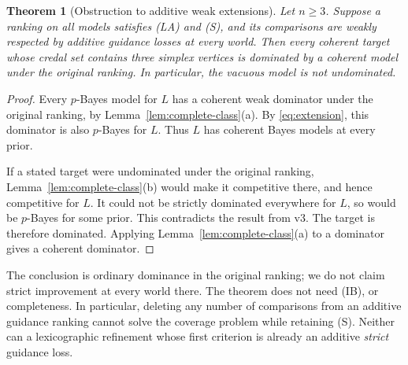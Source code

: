 \documentclass[11pt]{article}
\newtheorem{theorem}{Theorem}
\theoremstyle{remark}\newtheorem{remark}[theorem]{Remark}
\begin{document}
\begin{theorem}[Obstruction to additive weak extensions]\label{thm:extension}
Let $n\ge3$. Suppose a ranking on all models satisfies (LA) and (S), and
its comparisons are weakly respected by additive guidance losses at every
world. Then every coherent target whose credal set contains three simplex
vertices is dominated by a coherent model under the original ranking.
In particular, the vacuous model is not undominated.
\end{theorem}
\begin{proof}
Every $p$-Bayes model for $L$ has a coherent weak dominator under the original
ranking, by Lemma~\ref{lem:complete-class}(a). By \eqref{eq:extension}, this
dominator is also $p$-Bayes for $L$. Thus $L$ has coherent Bayes models at
every prior.

If a stated target were undominated under the original ranking,
Lemma~\ref{lem:complete-class}(b) would make it competitive there, and hence
competitive for $L$. It could not be strictly dominated everywhere for $L$,
so would be $p$-Bayes for some prior. This contradicts the result from v3.
The target is therefore dominated. Applying
Lemma~\ref{lem:complete-class}(a) to a dominator gives a coherent dominator.
\end{proof}

The conclusion is ordinary dominance in the original ranking; we do not
claim strict improvement at every world there. The theorem does not need
(IB), or completeness. In particular, deleting any number of comparisons
from an additive guidance ranking cannot solve the coverage problem while
retaining (S). Neither can a lexicographic refinement whose first criterion
is already an additive \emph{strict} guidance loss.
\end{document}

